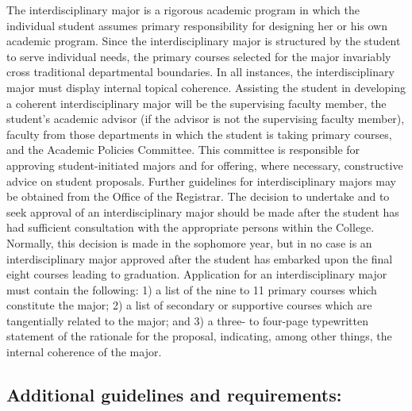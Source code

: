 \documentclass[
  letterpaper,
]{scrbook}
\begin{document}
The interdisciplinary major is a rigorous academic program in which the
individual student assumes primary responsibility for designing her or
his own academic program. Since the interdisciplinary major is
structured by the student to serve individual needs, the primary courses
selected for the major invariably cross traditional departmental
boundaries. In all instances, the interdisciplinary major must display
internal topical coherence. Assisting the student in developing a
coherent interdisciplinary major will be the supervising faculty member,
the student's academic advisor (if the advisor is not the supervising
faculty member), faculty from those departments in which the student is
taking primary courses, and the Academic Policies Committee. This
committee is responsible for approving student-initiated majors and for
offering, where necessary, constructive advice on student proposals.
Further guidelines for interdisciplinary majors may be obtained from the
Office of the Registrar. The decision to undertake and to seek approval
of an interdisciplinary major should be made after the student has had
sufficient consultation with the appropriate persons within the College.
Normally, this decision is made in the sophomore year, but in no case is
an interdisciplinary major approved after the student has embarked upon
the final eight courses leading to graduation. Application for an
interdisciplinary major must contain the following: 1) a list of the
nine to 11 primary courses which constitute the major; 2) a list of
secondary or supportive courses which are tangentially related to the
major; and 3) a three- to four-page typewritten statement of the
rationale for the proposal, indicating, among other things, the internal
coherence of the major.

\hypertarget{additional-guidelines-and-requirements}{%
\subsection{Additional guidelines and
requirements:}\label{additional-guidelines-and-requirements}}
\end{document}
